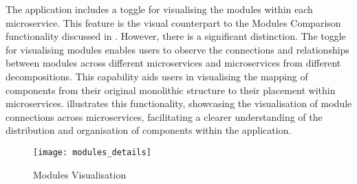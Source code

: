 The application includes a toggle for visualising the modules within each
microservice. This feature is the visual counterpart to the Modules Comparison
functionality discussed in .
However, there is a significant distinction. The toggle for visualising modules
enables users to observe the connections and relationships between modules
across different microservices and microservices from different decompositions.
This capability aids users in visualising the mapping of components from their
original monolithic structure to their placement within microservices.
 illustrates this functionality, showcasing the
visualisation of module connections across microservices, facilitating a
clearer understanding of the distribution and organisation of components within
the application.

\begin{figure*}[!htb]
  \centering
  \texttt{[image: modules\_details]}
  \caption{Modules Visualisation}
  \label{fig:modules_visualisation}
\end{figure*}
